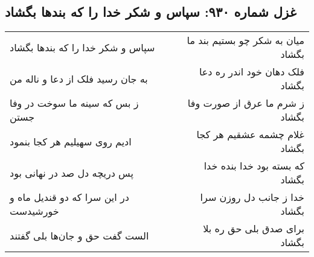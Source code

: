 \begin{center}
\section*{غزل شماره ۹۳۰: سپاس و شکر خدا را که بندها بگشاد}
\label{sec:0930}
\begin{longtable}{l p{0.5cm} r}
سپاس و شکر خدا را که بندها بگشاد
&&
میان به شکر چو بستیم بند ما بگشاد
\\
به جان رسید فلک از دعا و ناله من
&&
فلک دهان خود اندر ره دعا بگشاد
\\
ز بس که سینه ما سوخت در وفا جستن
&&
ز شرم ما عرق از صورت وفا بگشاد
\\
ادیم روی سهیلیم هر کجا بنمود
&&
غلام چشمه عشقیم هر کجا بگشاد
\\
پس دریچه دل صد در نهانی بود
&&
که بسته بود خدا بنده خدا بگشاد
\\
در این سرا که دو قندیل ماه و خورشیدست
&&
خدا ز جانب دل روزن سرا بگشاد
\\
الست گفت حق و جان‌ها بلی گفتند
&&
برای صدق بلی حق ره بلا بگشاد
\\
\end{longtable}
\end{center}
